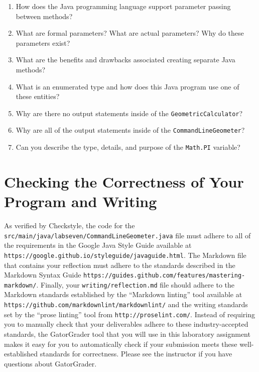 \documentclass[11pt]{article}
\newcommand{\mainprogram}{\lstinline{CommandLineGeometer}}
\newcommand{\mainprogramsource}{\lstinline{src/main/java/labseven/CommandLineGeometer.java}}
\newcommand{\secondprogram}{\lstinline{GeometricCalculator}}
\newcommand{\reflection}{\lstinline{writing/reflection.md}}
\newcommand{\program}[1]{\lstinline{#1}}
\newcommand{\url}[1]{\lstinline{#1}}
\newcommand{\step}[1]{``{#1}''}
\begin{document}
\begin{enumerate}

  \item How does the Java programming language support parameter passing
    between methods?

  \item What are formal parameters? What are actual parameters? Why do these
    parameters \mbox{exist}?

  \item What are the benefits and drawbacks associated creating separate
    Java methods?

  \item What is an enumerated type and how does this Java program use one of
    these entities?

  \item Why are there no output statements inside of the \secondprogram?

  \item Why are all of the output statements inside of the \mainprogram?

  \item Can you describe the type, details, and purpose of the \program{Math.PI}
    variable?

\end{enumerate}

\section*{Checking the Correctness of Your Program and Writing}

As verified by Checkstyle, the code for the \mainprogramsource{} file must
adhere to all of the requirements in the Google Java Style Guide available at
\url{https://google.github.io/styleguide/javaguide.html}. The Markdown file that
contains your reflection must adhere to the standards described in the Markdown
Syntax Guide \url{https://guides.github.com/features/mastering-markdown/}.
Finally, your \reflection{} file should adhere to the Markdown standards
established by the \step{Markdown linting} tool available at
\url{https://github.com/markdownlint/markdownlint/} and the writing standards
set by the \step{prose linting} tool from \url{http://proselint.com/}. Instead
of requiring you to manually check that your deliverables adhere to these
industry-accepted standards, the GatorGrader tool that you will use in this
laboratory assignment makes it easy for you to automatically check if your
submission meets these well-established standards for correctness. Please see
the instructor if you have questions about GatorGrader.
\end{document}

